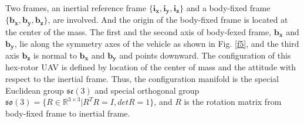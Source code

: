 \documentclass[letterpaper, 10 pt, conference]{ieeeconf}  %
\begin{document}
Two frames, an inertial reference frame $\{\bm{i_x},\bm{i_y},\bm{i_z}\}$ and a body-fixed frame $\{\bm{b_x},\bm{b_y},\bm{b_z}\}$, are involved.
And the origin of the body-fixed frame is located at the center of the mass.
The first and the second axis of body-fexed frame, $\bm{b_x}$ and $\bm{b_y}$, lie along the symmetry axes of the vehicle as shown in Fig. \ref{f5}, and the third axis $\bm{b_z}$ is normal to $\bm{b_x}$ and $\bm{b_y}$ and points downward.
The configuration of this hex-rotor UAV is defined by location of the center of mass and the attitude with respect to the inertial frame.
Thus, the configuration manifold is the special Euclidean group $\mathfrak{se}(3)$ and special orthogonal group $\mathfrak{so}(3)=\{R\in \mathbb{R}^{3\times 3} |R^TR=I, det R=1\}$, and $R$ is the rotation matrix from body-fixed frame to inertial frame.
\end{document}
